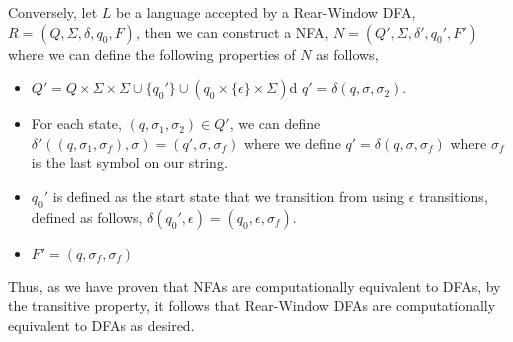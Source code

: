 \documentclass[12pt]{article}
\begin{document}
\begin{enumerate}
	Conversely, let $L$ be a language accepted by a Rear-Window DFA, $R = (Q, \Sigma, \delta, q_0, F)$, then we can construct a NFA, $N = (Q', \Sigma, \delta', q_0', F')$ where we can define the following properties of $N$ as follows,
	\begin{itemize}
		\item $Q' =  Q\times \Sigma \times \Sigma \cup \{q_0'\} \cup ({q_0} \times \{\epsilon\} \times \Sigma)$d $q' = \delta(q, \sigma, \sigma_2)$.
		\item For each state, $(q, \sigma_1, \sigma_2)\in Q'$, we can define $\delta'((q, \sigma_1, \sigma_f), \sigma) = (q', \sigma, \sigma_f)$ where we define $q' = \delta(q, \sigma, \sigma_f)$ where $\sigma_f$ is the last symbol on our string.
		\item $q_0'$ is defined as the start state that we transition from using $\epsilon$ transitions, defined as follows, $\delta(q_0', \epsilon) = (q_0, \epsilon, \sigma_f)$.
		\item $F' = (q, \sigma_f, \sigma_f)$
	\end{itemize}
	Thus, as we have proven that NFAs are computationally equivalent to DFAs, by the transitive property, it follows that Rear-Window DFAs are computationally equivalent to DFAs as desired.
\end{enumerate}
\end{document}
